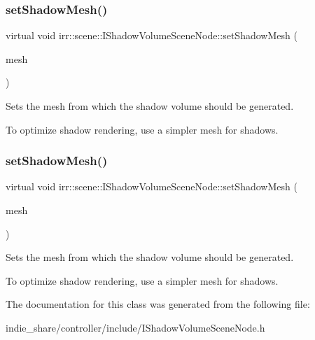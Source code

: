 \subsubsection{\texorpdfstring{set\+Shadow\+Mesh()}{setShadowMesh()}\hspace{0.1cm}{\footnotesize\ttfamily [1/2]}}
{\footnotesize\ttfamily virtual void irr\+::scene\+::\+I\+Shadow\+Volume\+Scene\+Node\+::set\+Shadow\+Mesh (\begin{DoxyParamCaption}\item[{const \hyperlink{classirr_1_1scene_1_1IMesh}{I\+Mesh} $\ast$}]{mesh }\end{DoxyParamCaption})\hspace{0.3cm}{\ttfamily [pure virtual]}}



Sets the mesh from which the shadow volume should be generated. 

To optimize shadow rendering, use a simpler mesh for shadows. \mbox{\label{classirr_1_1scene_1_1IShadowVolumeSceneNode_a69af3aa713c909106bacccdbab01184d}} 
\subsubsection{\texorpdfstring{set\+Shadow\+Mesh()}{setShadowMesh()}\hspace{0.1cm}{\footnotesize\ttfamily [2/2]}}
{\footnotesize\ttfamily virtual void irr\+::scene\+::\+I\+Shadow\+Volume\+Scene\+Node\+::set\+Shadow\+Mesh (\begin{DoxyParamCaption}\item[{const \hyperlink{classirr_1_1scene_1_1IMesh}{I\+Mesh} $\ast$}]{mesh }\end{DoxyParamCaption})\hspace{0.3cm}{\ttfamily [pure virtual]}}



Sets the mesh from which the shadow volume should be generated. 

To optimize shadow rendering, use a simpler mesh for shadows. 

The documentation for this class was generated from the following file\+:\begin{DoxyCompactItemize}
\item 
indie\+\_\+share/controller/include/I\+Shadow\+Volume\+Scene\+Node.\+h\end{DoxyCompactItemize}
